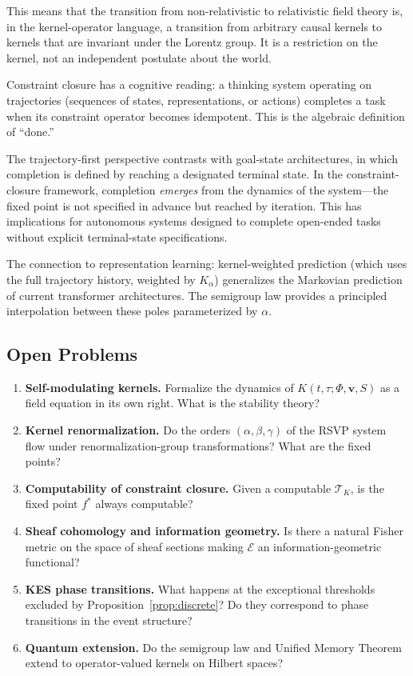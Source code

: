 \documentclass[12pt]{article}
\begin{document}
This means that the transition from non-relativistic to relativistic field
theory is, in the kernel-operator language, a transition from
arbitrary causal kernels to kernels that are invariant under the Lorentz group.
It is a restriction on the kernel, not an independent postulate about the world.


Constraint closure has a cognitive reading: a thinking system operating on
trajectories (sequences of states, representations, or actions) completes
a task when its constraint operator becomes idempotent. This is the algebraic
definition of ``done.''

The trajectory-first perspective contrasts with goal-state architectures,
in which completion is defined by reaching a designated terminal state.
In the constraint-closure framework, completion \emph{emerges} from the
dynamics of the system---the fixed point is not specified in advance but
reached by iteration. This has implications for autonomous systems designed
to complete open-ended tasks without explicit terminal-state specifications.

The connection to representation learning: kernel-weighted prediction
(which uses the full trajectory history, weighted by $K_\alpha$) generalizes
the Markovian prediction of current transformer architectures. The semigroup
law provides a principled interpolation between these poles parameterized
by $\alpha$.

\subsection{Open Problems}

\begin{enumerate}
  \item \textbf{Self-modulating kernels.} Formalize the dynamics of
    $K(t,\tau;\Phi,\mathbf{v},S)$ as a field equation in its own right.
    What is the stability theory?

  \item \textbf{Kernel renormalization.} Do the orders $(\alpha,\beta,\gamma)$
    of the RSVP system flow under renormalization-group transformations?
    What are the fixed points?

  \item \textbf{Computability of constraint closure.} Given a computable
    $\mathcal{T}_K$, is the fixed point $f^*$ always computable?

  \item \textbf{Sheaf cohomology and information geometry.} Is there a
    natural Fisher metric on the space of sheaf sections making $\mathcal{E}$
    an information-geometric functional?

  \item \textbf{KES phase transitions.} What happens at the exceptional
    thresholds excluded by Proposition~\ref{prop:discrete}? Do they
    correspond to phase transitions in the event structure?

  \item \textbf{Quantum extension.} Do the semigroup law and Unified Memory
    Theorem extend to operator-valued kernels on Hilbert spaces?
\end{enumerate}
\end{document}
